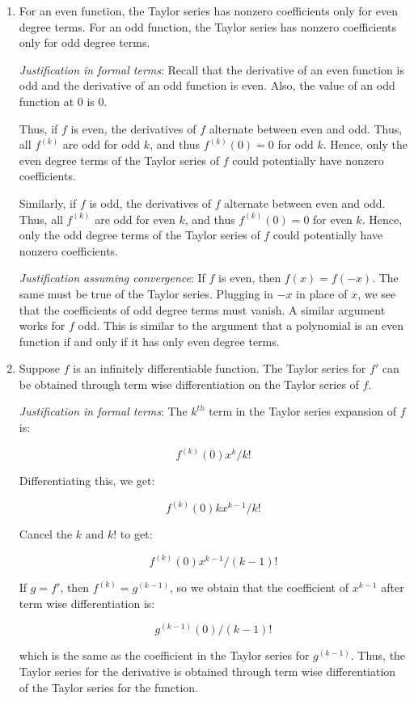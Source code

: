 \documentclass{amsart}
\begin{document}
\begin{enumerate}
\item For an even function, the Taylor series has nonzero coefficients
  only for even degree terms. For an odd function, the Taylor series
  has nonzero coefficients only for odd degree terms.

  {\em Justification in formal terms}: Recall that the derivative of
  an even function is odd and the derivative of an odd function is
  even. Also, the value of an odd function at $0$ is $0$.

  Thus, if $f$ is even, the derivatives of $f$ alternate between even
  and odd. Thus, all $f^{(k)}$ are odd for odd $k$, and thus
  $f^{(k)}(0) = 0$ for odd $k$. Hence, only the even degree terms of
  the Taylor series of $f$ could potentially have nonzero
  coefficients.

  Similarly, if $f$ is odd, the derivatives of $f$ alternate between
  even and odd. Thus, all $f^{(k)}$ are odd for even $k$, and thus
  $f^{(k)}(0) = 0$ for even $k$. Hence, only the odd degree terms of
  the Taylor series of $f$ could potentially have nonzero
  coefficients.

  {\em Justification assuming convergence}: If $f$ is even, then $f(x)
  = f(-x)$. The same must be true of the Taylor series. Plugging in
  $-x$ in place of $x$, we see that the coefficients of odd degree
  terms must vanish. A similar argument works for $f$ odd. This is
  similar to the argument that a polynomial is an even function if and
  only if it has only even degree terms.
\item Suppose $f$ is an infinitely differentiable function. The Taylor
  series for $f'$ can be obtained through term wise differentiation on
  the Taylor series of $f$.

  {\em Justification in formal terms}: The $k^{th}$ term in the Taylor
  series expansion of $f$ is:

  $$f^{(k)}(0)x^k/k!$$

  Differentiating this, we get:

  $$f^{(k)}(0)kx^{k-1}/k!$$

  Cancel the $k$ and $k!$ to get:

  $$f^{(k)}(0)x^{k-1}/(k-1)!$$

  If $g = f'$, then $f^{(k)} = g^{(k-1)}$, so we obtain that the
  coefficient of $x^{k-1}$ after term wise differentiation is:

  $$g^{(k-1)}(0)/(k-1)!$$

  which is the same as the coefficient in the Taylor series for
  $g^{(k-1)}$. Thus, the Taylor series for the derivative is obtained
  through term wise differentiation of the Taylor series for the
  function.


\end{enumerate}
\end{document}
